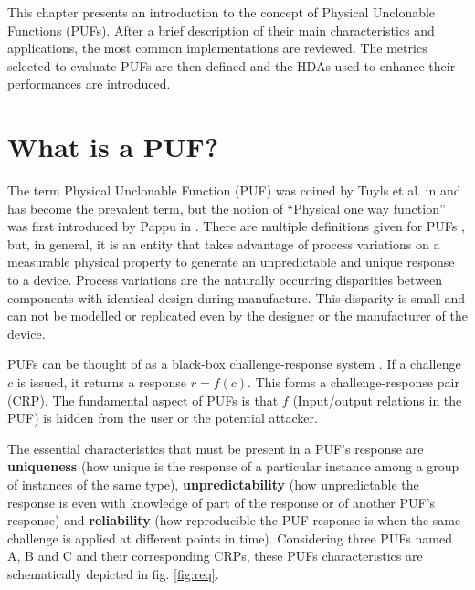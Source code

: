 \label{chap:2}

This chapter presents an introduction to the concept of Physical Unclonable Functions (PUFs). After a brief description of their main characteristics and applications, the most common implementations are reviewed. The metrics selected to evaluate PUFs are then defined and the HDAs used to enhance their performances are introduced. 

\section{What is a PUF?}
The term Physical Unclonable Function (PUF) was coined by Tuyls et al. in \cite{Tuyls2007} and has become the prevalent term, but the notion of ``Physical one way function'' was first introduced by Pappu in \cite{Pappu2002}. There are multiple definitions given for PUFs \cite{Xu2015,Bohm2013}, but, in general, it is an entity that takes advantage of process variations on a measurable physical property to generate an unpredictable and unique response to a device. Process variations are the naturally occurring disparities between components with identical design during manufacture. This disparity is small and can not be modelled or replicated even by the designer or the manufacturer of the device. 


PUFs can be thought of as a black-box challenge-response system \cite{Herder2014}. If a challenge $c$ is issued, it returns a response $r=f(c)$. This forms a challenge-response pair (CRP). The fundamental aspect of PUFs is that $f$ (Input/output relations in the PUF) is hidden from the user or the potential attacker.

The essential characteristics that must be present in a PUF's response are \textbf{uniqueness} (how unique is the response of a particular instance among a group of instances of the same type),  \textbf{unpredictability} (how unpredictable the response is even with knowledge of part of the response or of another PUF's response) and \textbf{reliability}  (how reproducible the PUF response is when the same challenge is applied at different points in time). Considering three PUFs named A, B and C and their corresponding CRPs, these PUFs characteristics are schematically depicted in fig. \ref{fig:req}.

